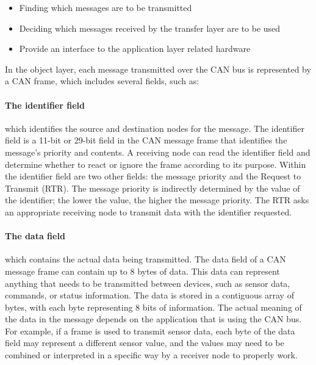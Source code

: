 \begin{itemize}
    \item Finding which messages are to be transmitted 
    \item Deciding which messages received by the transfer layer are to be used
    \item Provide an interface to the application layer related hardware
\end{itemize}

In the object layer, each message transmitted over the CAN bus is represented by a CAN frame, which includes several fields, such as:

\paragraph*{The identifier field} which identifies the source and destination nodes for the message. 
The identifier field is a 11-bit or 29-bit field  in the CAN message frame that identifies the message's priority and contents. 
A receiving node can read the identifier field and determine whether to react or ignore the frame according to its purpose. 
Within the identifier field are two other fields: the message priority and the Request to Transmit (RTR).
The message priority is indirectly determined by the value of the identifier; the lower the value, the higher the message priority.
The RTR asks an appropriate receiving node to transmit data with the identifier requested.

\paragraph*{The data field} which contains the actual data being transmitted. 
The data field of a CAN message frame can contain up to 8 bytes of data. 
This data can represent anything that needs to be transmitted between devices, such as sensor data, commands, or status information. 
The data is stored in a contiguous array of bytes, with each byte representing 8 bits of information.
The actual meaning of the data in the message depends on the application that is using the CAN bus. 
For example, if a frame is used to transmit sensor data, each byte of the data field may represent a different sensor value, and the values may need to be combined or interpreted in a specific way by a receiver node to properly work.


